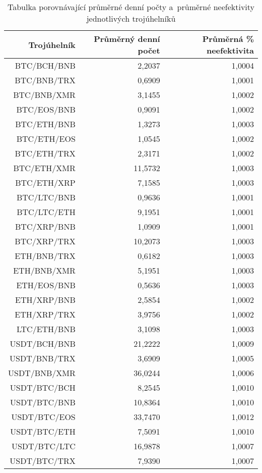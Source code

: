 \begin{table}\centering
\caption{Tabulka porovnávající průměrné denní počty a~průměrné neefektivity jednotlivých trojúhelníků}
\label{table_averages}
\begin{tabular}{|| r | r | r ||}\hline Trojúhelník & Průměrný denní počet & Průměrná \% neefektivita\\ [0.5ex]
 \hline\hline BTC/BCH/BNB & 2,2037 & 1,0004\\ 
 \hline BTC/BNB/TRX & 0,6909 & 1,0001\\ 
 \hline BTC/BNB/XMR & 3,1455 & 1,0002\\ 
 \hline BTC/EOS/BNB & 0,9091 & 1,0002\\ 
 \hline BTC/ETH/BNB & 1,3273 & 1,0003\\ 
 \hline BTC/ETH/EOS & 1,0545 & 1,0002\\ 
 \hline BTC/ETH/TRX & 2,3171 & 1,0002\\ 
 \hline BTC/ETH/XMR & 11,5732 & 1,0003\\ 
 \hline BTC/ETH/XRP & 7,1585 & 1,0003\\ 
 \hline BTC/LTC/BNB & 0,9636 & 1,0001\\ 
 \hline BTC/LTC/ETH & 9,1951 & 1,0001\\ 
 \hline BTC/XRP/BNB & 1,0909 & 1,0001\\ 
 \hline BTC/XRP/TRX & 10,2073 & 1,0003\\ 
 \hline ETH/BNB/TRX & 0,6182 & 1,0003\\ 
 \hline ETH/BNB/XMR & 5,1951 & 1,0003\\ 
 \hline ETH/EOS/BNB & 0,5636 & 1,0003\\ 
 \hline ETH/XRP/BNB & 2,5854 & 1,0002\\ 
 \hline ETH/XRP/TRX & 3,9756 & 1,0002\\ 
 \hline LTC/ETH/BNB & 3,1098 & 1,0003\\ 
 \hline USDT/BCH/BNB & 21,2222 & 1,0009\\ 
 \hline USDT/BNB/TRX & 3,6909 & 1,0005\\ 
 \hline USDT/BNB/XMR & 36,0244 & 1,0006\\ 
 \hline USDT/BTC/BCH & 8,2545 & 1,0010\\ 
 \hline USDT/BTC/BNB & 10,8364 & 1,0010\\ 
 \hline USDT/BTC/EOS & 33,7470 & 1,0012\\ 
 \hline USDT/BTC/ETH & 7,5091 & 1,0010\\ 
 \hline USDT/BTC/LTC & 16,9878 & 1,0007\\ 
 \hline USDT/BTC/TRX & 7,9390 & 1,0007\\ 

\end{tabular}
\end{table}

